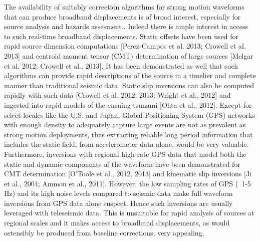 The availability of suitably correction algorithms for strong motion waveforms that can produce broadband displacements is of broad interest, especially for source analysis and hazards assesment.. Indeed there is ample interest in access to such real-time broadband displacements. Static offsets have been used for rapid source dimension computations [Perez-Campos et al. 2013; Crowell et al. 2013] and centroid moment tensor (CMT) determination of large sources [Melgar et al. 2012; Crowell et al., 2013]. It has been demonstrated as well that such algorithms can provide rapid descriptions of the source in a timelier and complete manner than traditional seismic data. Static slip inversions can also be computed rapidly with such data [Crowell et al. 2012, 2013; Wright et al., 2012] and ingested into rapid models of the ensuing tsunami [Ohta et al., 2012]. Except for select locales like the U.S. and Japan, Global Positioning System (GPS) networks with enough density to adequately capture large events are not as prevalent as strong motion deployments, thus extracting reliable long period information that includes the static field, from accelerometer data alone, would be very valuable. Furthermore, inversions with regional high-rate GPS data that model both the static and dynamic components of the waveform have been demonstrated for CMT determination [O’Toole et al., 2012, 2013] and kinematic slip inversions [Ji et al., 2004; Ammon et al., 2011]. However, the low sampling rates of GPS (~1-5 Hz) and its high noise levels compared to seismic data make full waveform inversions from GPS data alone suspect. Hence such inversions are usually leveraged with teleseismic data. This is unsuitable for rapid analysis of sources at regional scales and it makes access to broadband displacements, as would ostensibly be produced from baseline corrections, very appealing.


